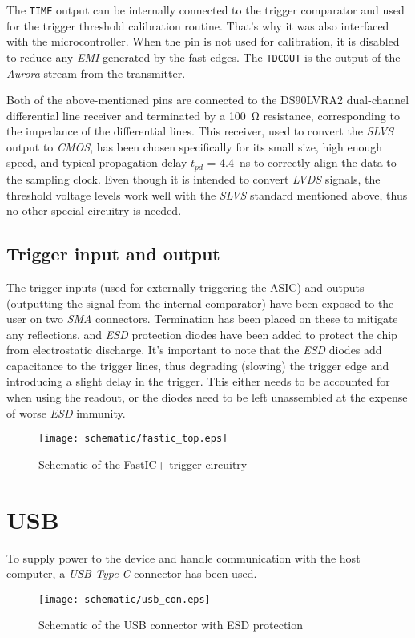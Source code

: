 The \verb|TIME| output can be internally connected to the trigger comparator and used for the trigger threshold calibration routine. That's why it was also interfaced with the microcontroller. When the pin is not used for calibration, it is disabled to reduce any \emph{EMI} generated by the fast edges. The \verb|TDCOUT| is the output of the \emph{Aurora} stream from the transmitter.

Both of the above-mentioned pins are connected to the DS90LVRA2 dual-channel differential line receiver and terminated by a \SI{100}{\ohm} resistance, corresponding to the impedance of the differential lines. This receiver, used to convert the \emph{SLVS} output to \emph{CMOS}, has been chosen specifically for its small size, high enough speed, and typical propagation delay $t_{pd}$ = \SI{4.4}{\nano\second} to correctly align the data to the sampling clock. Even though it is intended to convert \emph{LVDS} signals, the threshold voltage levels work well with the \emph{SLVS} standard mentioned above, thus no other special circuitry is needed. 

\subsection{Trigger input and output}
The trigger inputs (used for externally triggering the ASIC) and outputs (outputting the signal from the internal comparator) have been exposed to the user on two \emph{SMA} connectors. Termination has been placed on these to mitigate any reflections, and \emph{ESD} protection diodes have been added to protect the chip from electrostatic discharge. It's important to note that the \emph{ESD} diodes add capacitance to the trigger lines, thus degrading (slowing) the trigger edge and introducing a slight delay in the trigger. This either needs to be accounted for when using the readout, or the diodes need to be left unassembled at the expense of worse \emph{ESD} immunity. 
%
\FloatBarrier
\begin{figure}[htp!]
    \centering
    \texttt{[image: schematic/fastic\_top.eps]}
    \caption{Schematic of the FastIC+ trigger circuitry}
    \label{fig:schem_fastic_triggers}
\end{figure}
\FloatBarrier

\section{USB}
To supply power to the device and handle communication with the host computer, a \emph{USB Type-C} connector has been used.
\FloatBarrier
\begin{figure}[htp!]
    \centering
    \texttt{[image: schematic/usb\_con.eps]}
    \caption{Schematic of the USB connector with ESD protection}
    \label{fig:schem_usb_con}
\end{figure}
\FloatBarrier
